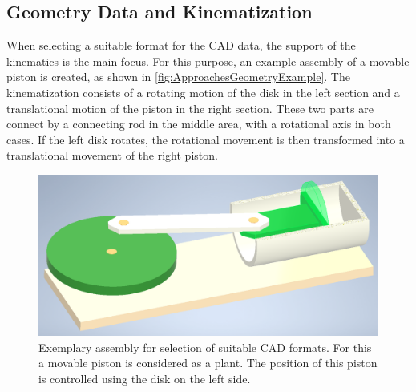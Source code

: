 \subsection{Geometry Data and Kinematization}
    When selecting a suitable format for the CAD data, the support of the kinematics is the main focus. For this purpose, an example assembly of a movable piston is created, as shown in \autoref{fig:ApproachesGeometryExample}. The kinematization consists of a rotating motion of the disk in the left section and a translational motion of the piston in the right section. These two parts are connect by a connecting rod in the middle area, with a rotational axis in both cases. If the left disk rotates, the rotational movement is then transformed into a translational movement of the right piston.\\
	\begin{figure}[ht]
		\centering
		\includegraphics[width=.6\linewidth]{figures/ApproachCadAssembly.PNG}
		\caption[Exemplary assembly for selection of suitable CAD formats.]{Exemplary assembly for selection of suitable CAD formats. For this a movable piston is considered as a plant. The position of this piston is controlled using the disk on the left side.}
		\label{fig:ApproachesGeometryExample}
	\end{figure}
    

